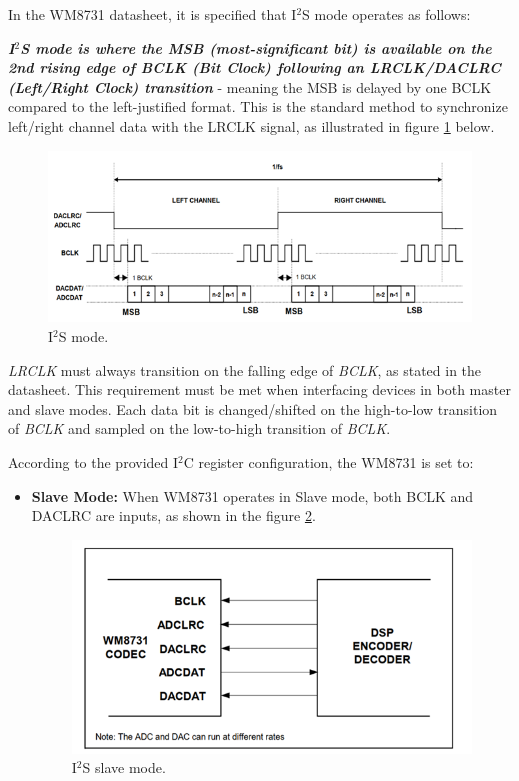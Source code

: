 In the WM8731 datasheet, it is specified that I$^{2}$S mode operates as follows:

\textbf{\textit{I$^{2}$S mode is where the MSB (most-significant bit) is available on the 2nd rising edge of BCLK (Bit Clock) following an LRCLK/DACLRC (Left/Right Clock) transition }} - meaning the MSB is delayed by one BCLK compared to the left-justified format. This is the standard method to synchronize left/right channel data with the LRCLK signal, as illustrated in figure \ref{fig: I2S mode} below.

\begin{figure}[H]
	\centering
	\includegraphics[width=.8\linewidth]{./my-chapters/my-images/theoretical_background/I2S_mode.png}
	\caption{I$^{2}$S mode.}
	\label{fig: I2S mode}
\end{figure}

\textit{LRCLK} must always transition on the falling edge of \textit{BCLK}, as stated in the datasheet. This requirement must be met when interfacing devices in both master and slave modes. Each data bit is changed/shifted on the high-to-low transition of \textit{BCLK} and sampled on the low-to-high transition of \textit{BCLK}.

According to the provided I$^{2}$C register configuration, the WM8731 is set to:

\begin{itemize}[label=-]
	\item\textbf{ Slave Mode:} When WM8731 operates in Slave mode, both BCLK and DACLRC are inputs, as shown in the figure \ref{fig: I2S slave mode}.
	
	\begin{figure}[H]
		\centering
		\includegraphics[width=.8\linewidth]{./my-chapters/my-images/theoretical_background/I2S_slave_mode.png}
		\caption{I$^{2}$S slave mode.}
		\label{fig: I2S slave mode}
	\end{figure}
\end{itemize}